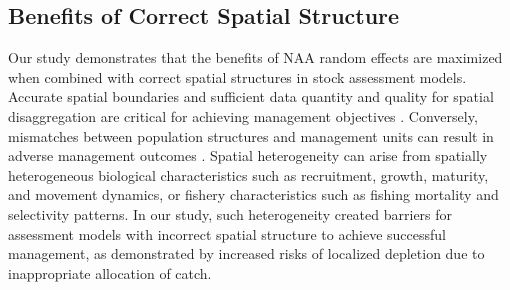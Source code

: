 \documentclass[
  12pt,
]{article}
\begin{document}
\hypertarget{benefits-of-correct-spatial-structure}{%
\subsection{Benefits of Correct Spatial
Structure}\label{benefits-of-correct-spatial-structure}}

Our study demonstrates that the benefits of NAA random effects are
maximized when combined with correct spatial structures in stock
assessment models. Accurate spatial boundaries and sufficient data
quantity and quality for spatial disaggregation are critical for
achieving management objectives \citep{Berger2021}. Conversely,
mismatches between population structures and management units can result
in adverse management outcomes
\citep{Cope2011, Hintzen2015, Kerr2017, Berger2021}. Spatial
heterogeneity can arise from spatially heterogeneous biological
characteristics such as recruitment, growth, maturity, and movement
dynamics, or fishery characteristics such as fishing mortality and
selectivity patterns. In our study, such heterogeneity created barriers
for assessment models with incorrect spatial structure to achieve
successful management, as demonstrated by increased risks of localized
depletion due to inappropriate allocation of catch.
\end{document}
